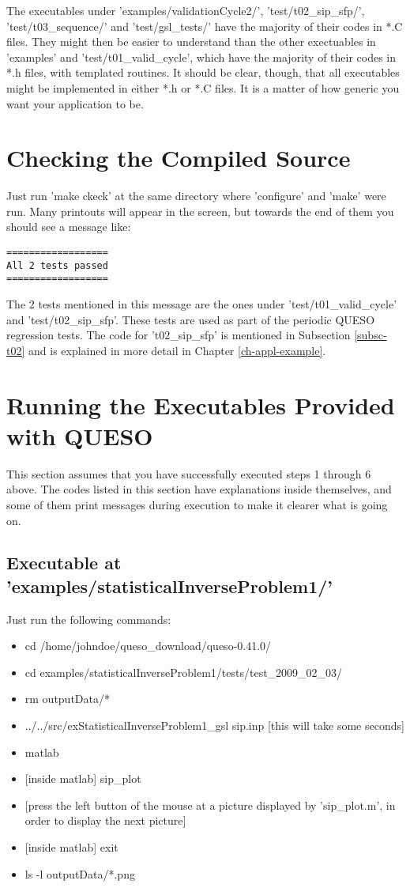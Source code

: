 The executables under 'examples/validationCycle2/', 'test/t02\_sip\_sfp/', 'test/t03\_sequence/' and 'test/gsl\_tests/'
have the majority of their codes in *.C files.
They might then be easier to understand than
the other exectuables in 'examples' and 'test/t01\_valid\_cycle', which
have the majority of their codes in *.h files, with templated routines.
It should be clear, though, that all executables might be implemented in either *.h or *.C files.
It is a matter of how generic you want your application to be.

\section{Checking the Compiled Source} \label{sc-checks}

Just run 'make ckeck' at the same directory where 'configure' and 'make' were run.
Many printouts will appear in the screen, but towards the end of them you should see
a message like:
\begin{verbatim}
==================
All 2 tests passed
==================
\end{verbatim}

The 2 tests mentioned in this message are the ones under 'test/t01\_valid\_cycle' and
'test/t02\_sip\_sfp'. These tests are used as part of the periodic QUESO regression tests.
The code for 't02\_sip\_sfp' is mentioned in Subsection \ref{subsc-t02} and is explained in more detail in Chapter \ref{ch-appl-example}.

\section{Running the Executables Provided with QUESO} \label{sc-running-execs}

This section assumes that you have successfully executed steps 1 through 6 above.
The codes listed in this section have explanations inside themselves, and some of them
print messages during execution to make it clearer what is going on.

\subsection{Executable at 'examples/statisticalInverseProblem1/'}

Just run the following commands:
\begin{itemize}
\item cd /home/johndoe/queso\_download/queso-0.41.0/
\item cd examples/statisticalInverseProblem1/tests/test\_2009\_02\_03/
\item rm outputData/*
\item ../../src/exStatisticalInverseProblem1\_gsl sip.inp [this will take some seconds]
\item matlab
\item {[inside matlab]} sip\_plot
\item {[press the left button of the mouse at a picture displayed by 'sip\_plot.m', in order to display the next picture]}
\item {[inside matlab]} exit
\item ls -l outputData/*.png
\end{itemize}

